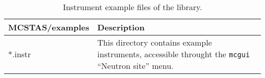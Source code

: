 \begin{table}
  \begin{center}
    {\let\my=\\
    \begin{tabular}{|p{}|p{}|}
      \hline
       \textbf{MCSTAS/examples} & Description \\
      \hline
      *.instr & This directory contains example instruments, accessible throught the \verb+mcgui+ ``Neutron site'' menu. \\
      \hline
    \end{tabular}
    \caption{Instrument example files of the \MCS library.}
    \label{t:comp-instr}
    }
  \end{center}
\end{table}
